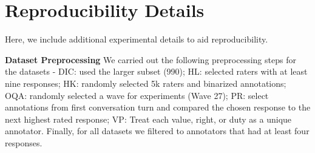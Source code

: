 \documentclass[11pt]{article}
\begin{document}
% 


\section{Reproducibility Details}
\label{sec:reproducibility}


Here, we include additional experimental details to aid reproducibility.

\textbf{Dataset Preprocessing}
We carried out the following preprocessing steps for the datasets -
DIC: used the larger subset (990);
HL: selected raters with at least nine responses;
HK: randomly selected 5k raters and binarized annotations;
OQA: randomly selected a wave for experiments (Wave 27);
PR: select annotations from first conversation turn and compared the chosen response to the next highest rated response;
VP: Treat each value, right, or duty as a unique annotator.
Finally, for all datasets we filtered to annotators that had at least four responses.
\end{document}
